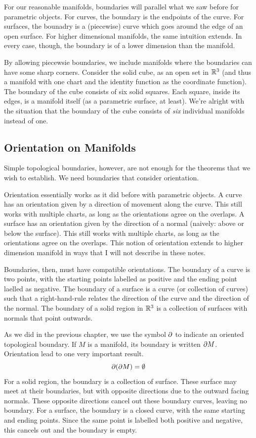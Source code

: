 \documentclass[fleqn,letterpaper]{report}
\begin{document}
For our reasonable manifolds, boundaries will parallel what we
saw before for parametric objects. For curves, the boundary is
the endpoints of the curve.  For surfaces, the bounadry is a
(piecewise) curve which goes around the edge of an open
surface. For higher dimensional manifolds, the same intuition
extends. In every case, though, the boundary is of a lower
dimension than the manifold. 

By allowing piecewsie boundaries, we include manifolds where
the boundaries can have some sharp corners.  Consider the
solid cube, as an open set in $\mathbb{R}^3$ (and thus a manifold
with one chart and the identity function as the coordinate
function). The boundary of the cube consists of six solid
squares. Each square, inside its edges, is a manifold itself
(as a parametric surface, at least). We're alright with the
situation that the boundary of the cube consists of \emph{six}
individual manifolds instead of one.

\subsection{Orientation on Manifolds}
\label{manifold-orientation}

Simple topological boundaries, however, are not enough for the
theorems that we wish to establish. We need boundaries that
consider orientation. 

Orientation essentially works as it did before with
parametric objects. A curve has an orientation given by a
direction of movement along the curve. This still works with
multiple charts, as long as the orientations agree on the
overlaps. A surface has an orientation given by the direction
of a normal (naively: above or below the surface). This still
works with multiple charts, as long as the orientations agree
on the overlaps. This notion of orientation extends to higher
dimension manifold in ways that I will not describe in these
notes. 

Boundaries, then, must have compatible orientations. The
boundary of a curve is two points, with the starting points
labelled as positive and the ending point laelled as negative.
The boundary of a surface is a curve (or collection of curves)
such that a right-hand-rule relates the direction of the curve
and the direction of the normal. The boundary of a solid
region in $\mathbb{R}^3$ is a collection of surfaces with normals that
point outwards.

As we did in the previous chapter, we use the symbol $\partial$ to
indicate an oriented topological boundary. If $M$ is a
manifold, its boundary is written $\partial M$. Orientation lead
to one very important result.
\begin{equation*}
\partial (\partial M) = \emptyset
\end{equation*}
For a solid region, the boundary is a collection of surface.
These surface may meet at their boundaries, but with opposite
directions due to the outward facing normals. These opposite
directions cancel out these boundary curves, leaving no
boundary. For a surface, the boundary is a closed curve, with
the same starting and ending points. Since the same point is
labelled both positive and negative, this cancels out and the
boundary is empty. 
\end{document}
